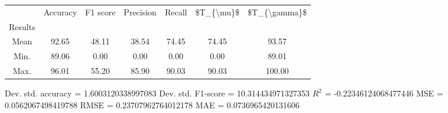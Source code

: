\begin{tabular}{|c|c|c|c|c|c|c|}
\toprule
{} &  Accuracy &  F1 score &  Precision &  Recall &  \$T\_\{\textbackslash mu\}\$ &  \$T\_\{\textbackslash gamma\}\$ \\
Results &           &           &            &         &            &               \\
\hline
Mean    &     92.65 &     48.11 &      38.54 &   74.45 &      74.45 &         93.57 \\
Min.    &     89.06 &      0.00 &       0.00 &    0.00 &       0.00 &         89.01 \\
Max.    &     96.01 &     55.20 &      85.90 &   90.03 &      90.03 &        100.00 \\
\bottomrule
\end{tabular}

 Dev. std. accuracy = 1.6003120338997083
 Dev. std. F1-score = 10.314434971327353
 $R^2$ = -0.22346124068477446
 MSE = 0.0562067498419788
 RMSE = 0.23707962764012178
 MAE = 0.0736965420131606